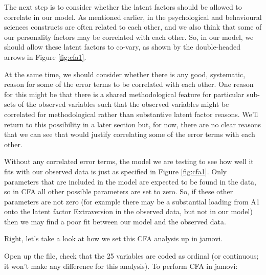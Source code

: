 The next step is to consider whether the latent factors should be allowed to correlate in our model. As mentioned earlier, in the psychological and behavioural sciences constructs are often related to each other, and we also think that some of our personality factors may be correlated with each other. So, in our model, we should allow these latent factors to co-vary, as shown by the double-headed arrows in Figure \ref{fig:cfa1}. 

At the same time, we should consider whether there is any good, systematic, reason for some of the error terms to be correlated with each other. One reason for this might be that there is a shared methodological feature for particular sub-sets of the observed variables such that the observed variables might be correlated for methodological rather than substantive latent factor reasons. We’ll return to this possibility in a later section but, for now, there are no clear reasons that we can see that would justify correlating some of the error terms with each other.

Without any correlated error terms, the model we are testing to see how well it fits with our observed data is just as specified in Figure \ref{fig:cfa1}. Only parameters that are included in the model are expected to be found in the data, so in CFA all other possible parameters are set to zero. So, if these other parameters are not zero (for example there may be a substantial loading from A1 onto the latent factor Extraversion in the observed data, but not in our model) then we may find a poor fit between our model and the observed data. 

Right, let’s take a look at how we set this CFA analysis up in jamovi.


Open up the  file, check that the 25 variables are coded as ordinal (or continuous; it won’t make any difference for this analysis). To perform CFA in jamovi:

